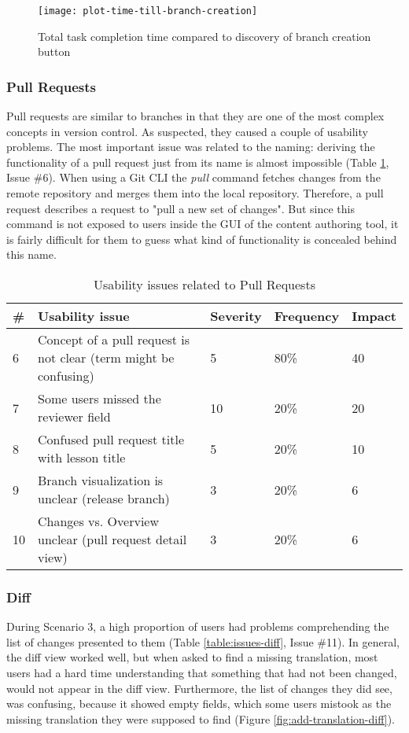 \begin{figure}[h!]
 \centering
 \texttt{[image: plot-time-till-branch-creation]}
 \caption{Total task completion time compared to discovery of branch creation button}
 \label{fig:branch-creation-time}
\end{figure}

\subsubsection{Pull Requests}
Pull requests are similar to branches in that they are one of the most complex concepts in version control. As suspected, they caused a couple of usability problems. The most important issue was related to the naming: deriving the functionality of a pull request just from its name is almost impossible (Table \ref{table:issues-pull-requests}, Issue \#6). When using a Git CLI the \emph{pull} command fetches changes from the remote repository and merges them into the local repository. Therefore, a pull request describes a request to "pull a new set of changes". But since this command is not exposed to users inside the GUI of the content authoring tool, it is fairly difficult for them to guess what kind of functionality is concealed behind this name.

\begin{table}[h!]
\centering
\begin{tabular}{|l|p{7cm}|l|l|l|}
\hline
\rowcolor[HTML]{EFEFEF}
\textbf{\#} & \textbf{Usability issue} & \textbf{Severity} & \textbf{Frequency} & \textbf{Impact} \\ \hline
6 & Concept of a pull request is not clear (term might be confusing) & 5 & 80\% & 40 \\ \hline
7 & Some users missed the reviewer field & 10 & 20\% & 20 \\ \hline
8 & Confused pull request title with lesson title & 5 & 20\% & 10 \\ \hline
9 & Branch visualization is unclear (release branch) & 3 & 20\% & 6 \\ \hline
10 & Changes vs. Overview unclear (pull request detail view) & 3 & 20\% & 6 \\ \hline
\end{tabular}
\caption{Usability issues related to Pull Requests}
\label{table:issues-pull-requests}
\end{table}

\subsubsection{Diff}
During Scenario 3, a high proportion of users had problems comprehending the list of changes presented to them (Table \ref{table:issues-diff}, Issue \#11). In general, the diff view worked well, but when asked to find a missing translation, most users had a hard time understanding that something that had not been changed, would not appear in the diff view. Furthermore, the list of changes they did see, was confusing, because it showed empty fields, which some users mistook as the missing translation they were supposed to find (Figure \ref{fig:add-translation-diff}).

